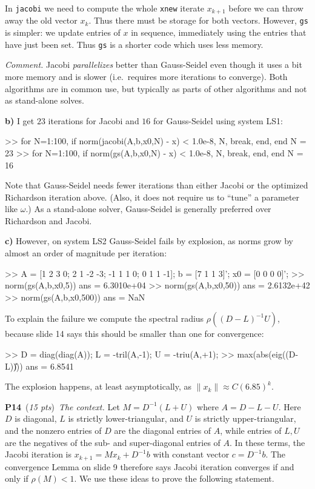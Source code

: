\documentclass[11pt]{amsart}
\newcommand{\probpts}[2]{\bigskip\noindent\large \textbf{#1} \normalsize \,(\emph{#2})\,}
\newcommand{\epart}[1]{\medskip\noindent\textbf{#1)}}
\begin{document}
In \texttt{jacobi} we need to compute the whole \texttt{xnew} iterate $x_{k+1}$ before we can throw away the old vector $x_k$.  Thus there must be storage for both vectors.  However, \texttt{gs} is simpler: we update entries of $x$ in sequence, immediately using the entries that have just been set.  Thus \texttt{gs} is a shorter code which uses less memory.

\medskip
\noindent
\emph{Comment.}  Jacobi \emph{parallelizes} better than Gauss-Seidel even though it uses a bit more memory and is slower (i.e.~requires more iterations to converge).  Both algorithms are in common use, but typically as parts of other algorithms and not as stand-alone solves.

\clearpage\newpage
\epart{b}  I get $23$ iterations for Jacobi and $16$ for Gauss-Seidel using system LS1:
\begin{mVerb}
>> for N=1:100, if norm(jacobi(A,b,x0,N) - x) < 1.0e-8, N, break, end, end
N =                   23
>> for N=1:100, if norm(gs(A,b,x0,N) - x) < 1.0e-8, N, break, end, end
N =                   16
\end{mVerb}

Note that Gauss-Seidel needs fewer iterations than either Jacobi or the optimized Richardson iteration above.  (Also, it does not require us to ``tune'' a parameter like $\omega$.)  As a stand-alone solver, Gauss-Seidel is generally preferred over Richardson and Jacobi.

\epart{c}  However, on system LS2 Gauss-Seidel fails by explosion, as norms grow by almost an order of magnitude per iteration:
\begin{mVerb}
>> A = [1 2 3 0; 2 1 -2 -3; -1 1 1 0; 0 1 1 -1];  b = [7 1 1 3]';  x0 = [0 0 0 0]';
>> norm(gs(A,b,x0,5))
ans =    6.3010e+04
>> norm(gs(A,b,x0,50))
ans =    2.6132e+42
>> norm(gs(A,b,x0,500))
ans = NaN
\end{mVerb}

To explain the failure we compute the spectral radius $\rho((D-L)^{-1} U)$, because slide 14 says this should be smaller than one for convergence:
\begin{mVerb}
>> D = diag(diag(A));  L = -tril(A,-1);  U = -triu(A,+1);
>> max(abs(eig((D-L)\U)))
ans =  6.8541
\end{mVerb}
The explosion happens, at least asymptotically, as $\|x_k\| \approx C (6.85)^k$.


\probpts{P14}{15 pts}  \emph{The context.}  Let $M = D^{-1}(L+U)$ where $A=D-L-U$.  Here $D$ is diagonal, $L$ is strictly lower-triangular, and $U$ is strictly upper-triangular, and the nonzero entries of $D$ are the diagonal entries of $A$, while entries of $L,U$ are the negatives of the sub- and super-diagonal entries of $A$.  In these terms, the Jacobi iteration is $x_{k+1} = M x_k + D^{-1} b$ with constant vector $c=D^{-1} b$.  The convergence Lemma on slide 9 therefore says Jacobi iteration converges if and only if $\rho(M) < 1$.  We use these ideas to prove the following statement.
\end{document}
